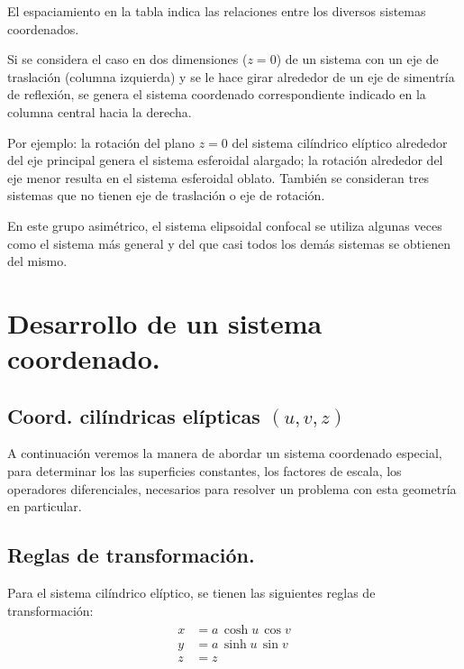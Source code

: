 El espaciamiento en la tabla indica las relaciones entre los diversos sistemas coordenados.
\par
Si se considera el caso en dos dimensiones ($z = 0$) de un sistema con un eje de traslación (columna izquierda) y se le hace girar alrededor de un eje de simentría de reflexión, se genera el sistema coordenado correspondiente indicado en la columna central hacia la derecha.
\par
Por ejemplo: la rotación del plano $z = 0$ del sistema cilíndrico elíptico alrededor del eje principal genera el sistema esferoidal alargado; la rotación alrededor del eje menor resulta en el sistema esferoidal oblato. También se consideran tres sistemas que no tienen eje de traslación o eje de rotación.
\par
En este grupo asimétrico, el sistema elipsoidal confocal se utiliza algunas veces como el sistema más general y del que casi todos los demás sistemas se obtienen del mismo.
\section{Desarrollo de un sistema coordenado.}
\subsection{Coord. cilíndricas elípticas {$(u, v, z)$}}
A continuación veremos la manera de abordar un sistema coordenado especial, para determinar los las superficies constantes, los factores de escala, los operadores diferenciales, necesarios para resolver un problema con esta geometría en particular.
\subsection{Reglas de transformación.}
Para el sistema cilíndrico elíptico, se tienen las siguientes reglas de transformación:
\begin{align}
\begin{aligned}
x &= a \, \cosh u \, \cos v \\
y &= a \, \sinh u \, \sin v \\
z &= z
\end{aligned}
\label{eq:ecuacion_02_73_esp}
\end{align}
